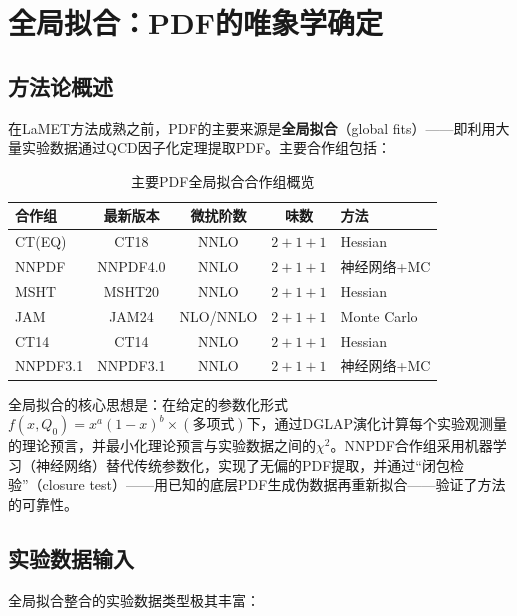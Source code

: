 \documentclass[12pt,a4paper]{ctexart}
\theoremstyle{definition}
\begin{document}
\section{全局拟合：PDF的唯象学确定}

\subsection{方法论概述}

在LaMET方法成熟之前，PDF的主要来源是\textbf{全局拟合}（global fits）——即利用大量实验数据通过QCD因子化定理提取PDF。主要合作组包括：

\begin{table}[H]
\centering
\caption{主要PDF全局拟合合作组概览}
\label{tab:global_fits}
\begin{tabular}{lcccl}
\toprule
合作组 & 最新版本 & 微扰阶数 & 味数 & 方法 \\
\midrule
CT(EQ) & CT18 \cite{CT18} & NNLO & $2+1+1$ & Hessian \\
NNPDF & NNPDF4.0 \cite{NNPDF40} & NNLO & $2+1+1$ & 神经网络+MC \\
MSHT & MSHT20 \cite{MSHT20} & NNLO & $2+1+1$ & Hessian \\
JAM & JAM24 \cite{JAM24} & NLO/NNLO & $2+1+1$ & Monte Carlo \\
\midrule
CT14 & CT14 \cite{CT14} & NNLO & $2+1+1$ & Hessian \\
NNPDF3.1 & NNPDF3.1 \cite{NNPDF31} & NNLO & $2+1+1$ & 神经网络+MC \\
\bottomrule
\end{tabular}
\end{table}

全局拟合的核心思想是：在给定的参数化形式$f(x, Q_0) = x^{a}(1-x)^{b} \times (\text{多项式})$下，通过DGLAP演化计算每个实验观测量的理论预言，并最小化理论预言与实验数据之间的$\chi^2$。NNPDF合作组\cite{NNPDF40}采用机器学习（神经网络）替代传统参数化，实现了无偏的PDF提取，并通过``闭包检验''（closure test）——用已知的底层PDF生成伪数据再重新拟合——验证了方法的可靠性。

\subsection{实验数据输入}

全局拟合整合的实验数据类型极其丰富\cite{NNPDF40,NNPDF31,CT18}：
\end{document}
